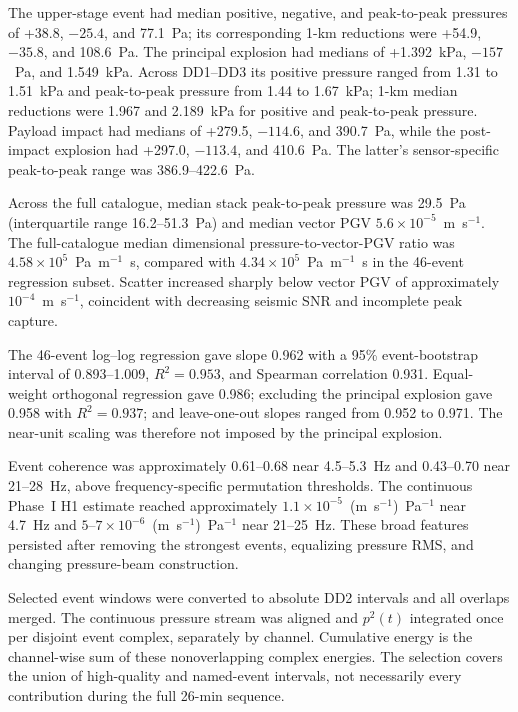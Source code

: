 \documentclass[]{seismica}
\begin{document}
The upper-stage event had median positive, negative, and peak-to-peak
pressures of +38.8, $-25.4$, and 77.1~Pa; its corresponding 1-km reductions
were +54.9, $-35.8$, and 108.6~Pa. The principal explosion had medians of
+1.392~kPa, $-157$~Pa, and 1.549~kPa. Across DD1--DD3 its positive pressure
ranged from 1.31 to 1.51~kPa and peak-to-peak pressure from 1.44 to 1.67~kPa;
1-km median reductions were 1.967 and 2.189~kPa for positive and peak-to-peak
pressure. Payload impact had medians of +279.5, $-114.6$, and 390.7~Pa, while
the post-impact explosion had +297.0, $-113.4$, and 410.6~Pa. The latter's
sensor-specific peak-to-peak range was 386.9--422.6~Pa.

Across the full catalogue, median stack peak-to-peak pressure was 29.5~Pa
(interquartile range 16.2--51.3~Pa) and median vector PGV
$5.6\times10^{-5}$~m~s$^{-1}$. The full-catalogue median dimensional
pressure-to-vector-PGV ratio was
$4.58\times10^5$~Pa~m$^{-1}$~s, compared with
$4.34\times10^5$~Pa~m$^{-1}$~s in the 46-event regression subset. Scatter
increased sharply below vector PGV of approximately $10^{-4}$~m~s$^{-1}$,
coincident with decreasing seismic SNR and incomplete peak capture.

The 46-event log--log regression gave slope 0.962 with a 95\% event-bootstrap
interval of 0.893--1.009, $R^2=0.953$, and Spearman correlation 0.931.
Equal-weight orthogonal regression gave 0.986; excluding the principal
explosion gave 0.958 with $R^2=0.937$; and leave-one-out slopes ranged from
0.952 to 0.971. The near-unit scaling was therefore not imposed by the
principal explosion.

Event coherence was approximately 0.61--0.68 near 4.5--5.3~Hz and
0.43--0.70 near 21--28~Hz, above frequency-specific permutation thresholds.
The continuous Phase~I H1 estimate reached approximately
$1.1\times10^{-5}$~(m~s$^{-1}$)~Pa$^{-1}$ near 4.7~Hz and
$5$--$7\times10^{-6}$~(m~s$^{-1}$)~Pa$^{-1}$ near 21--25~Hz. These broad
features persisted after removing the strongest events, equalizing pressure
RMS, and changing pressure-beam construction.

Selected event windows were converted to absolute DD2 intervals and all
overlaps merged. The continuous pressure stream was aligned and $p^2(t)$
integrated once per disjoint event complex, separately by channel. Cumulative
energy is the channel-wise sum of these nonoverlapping complex energies. The
selection covers the union of high-quality and named-event intervals, not
necessarily every contribution during the full 26-min sequence.
\end{document}
